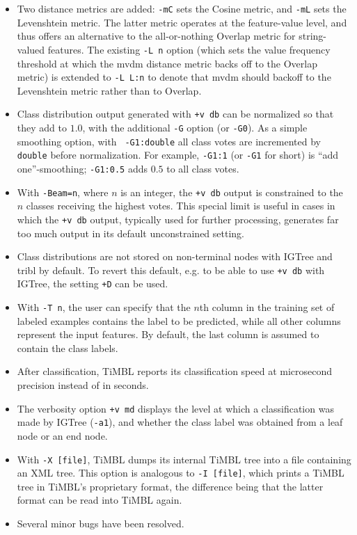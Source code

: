\documentclass{report}
\begin{document}
\begin{itemize}

\item Two distance metrics are added: {\tt -mC} sets the Cosine
  metric, and {\tt -mL} sets the Levenshtein metric. The latter metric
  operates at the feature-value level, and thus offers an alternative
  to the all-or-nothing Overlap metric for string-valued features. The
  existing {\tt -L n} option (which sets the value frequency threshold
  at which the {\sc mvdm} distance metric backs off to the Overlap
  metric) is extended to {\tt -L L:n} to denote that {\sc mvdm} should
  backoff to the Levenshtein metric rather than to Overlap.

\item Class distribution output generated with {\tt +v db} can be
  normalized so that they add to $1.0$, with the additional {\tt -G}
  option (or {\tt -G0}). As a simple smoothing option, with {\tt
    -G1:double} all class votes are incremented by {\tt double} before
  normalization.  For example, {\tt -G1:1} (or {\tt -G1} for short) is
  ``add one''-smoothing; {\tt -G1:0.5} adds $0.5$ to all class votes.

\item With {\tt -Beam=n}, where $n$ is an integer, the {\tt +v db}
  output is constrained to the $n$ classes receiving the highest
  votes. This special limit is useful in cases in which the {\tt +v
    db} output, typically used for further processing, generates far
  too much output in its default unconstrained setting.

\item Class distributions are not stored on non-terminal nodes with
  {\sc IGTree} and {\sc tribl} by default. To revert this default,
  e.g. to be able to use {\tt +v db} with {\sc IGTree}, the setting
  {\tt +D} can be used.

\item With {\tt -T n}, the user can specify that the $n$th column in
  the training set of labeled examples contains the label to be
  predicted, while all other columns represent the input features. By
  default, the last column is assumed to contain the class labels.

\item After classification, TiMBL reports its classification speed at
  microsecond precision instead of in seconds.

\item The verbosity option {\tt +v md} displays the level at which a
  classification was made by {\sc IGTree} ({\tt -a1}), and whether the
  class label was obtained from a leaf node or an end node.

\item With {\tt -X [file]}, TiMBL dumps its internal TiMBL tree into a
  file containing an XML tree. This option is analogous to {\tt -I
    [file]}, which prints a TiMBL tree in TiMBL's proprietary format,
  the difference being that the latter format can be read into TiMBL
  again.

\item Several minor bugs have been resolved.

\end{itemize}
\end{document}
